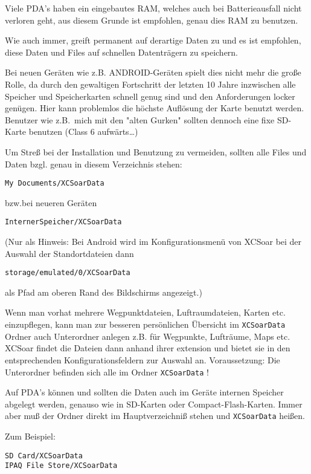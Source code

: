 Viele PDA's haben ein eingebautes RAM, welches auch bei Batterieausfall nicht verloren geht, aus diesem
Grunde ist empfohlen, genau dies RAM zu benutzen.

Wie auch immer, \xc greift permanent auf derartige Daten zu und es ist empfohlen, diese Daten und
Files auf schnellen Datenträgern zu speichern.

Bei neuen Geräten wie z.B. ANDROID-Geräten spielt dies nicht mehr die große Rolle, da durch den
gewaltigen Fortschritt der letzten 10 Jahre inzwischen alle Speicher und Speicherkarten schnell genug sind und den Anforderungen locker genügen. Hier kann problemlos die höchste Auflösung der Karte benutzt werden.
Benutzer wie z.B.\ mich mit den "alten Gurken" sollten dennoch eine fixe SD-Karte benutzen (Class 6
aufwärts\dots)


Um Streß bei der Installation und Benutzung zu vermeiden, sollten alle Files und Daten bzgl. \xc  genau in
diesem Verzeichnis stehen:

\begin{verbatim}
My Documents/XCSoarData
\end{verbatim}

bzw.bei neueren Geräten

\begin{verbatim}
InternerSpeicher/XCSoarData
\end{verbatim}

(Nur als Hinweis: Bei Android wird im Konfigurationsmenü von XCSoar bei der Auswahl der Standortdateien dann
\begin{verbatim}
storage/emulated/0/XCSoarData 
\end{verbatim} 
als Pfad am oberen Rand des Bildschirms angezeigt.)

Wenn man vorhat mehrere Wegpunktdateien, Luftraumdateien, Karten etc. einzupflegen, kann man zur besseren persönlichen Übersicht im \verb|XCSoarData| Ordner auch Unterordner anlegen z.B. für Wegpunkte, Lufträume, Maps etc. 
XCSoar findet die Dateien dann anhand ihrer extension und bietet sie in den entsprechenden Konfigurationsfeldern zur Auswahl an. Voraussetzung: Die Unterordner befinden sich alle im Ordner \verb|XCSoarData| !


Auf PDA's können und sollten die Daten auch im Geräte internen Speicher abgelegt werden, genauso wie in
SD-Karten oder Compact-Flash-Karten. Immer aber muß der Ordner direkt im Hauptverzeichniß stehen und
\verb|XCSoarData| heißen.

Zum Beispiel:
\begin{verbatim}
SD Card/XCSoarData
IPAQ File Store/XCSoarData
\end{verbatim}

